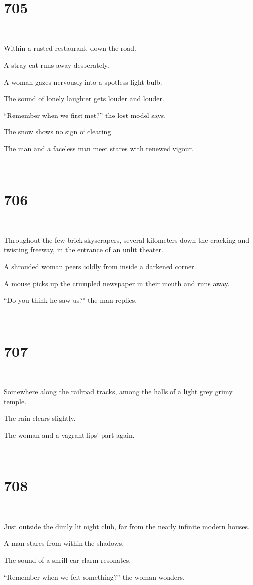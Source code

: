 \documentclass{report}
\begin{document}
~
\chapter*{705}
~

Within a rusted restaurant, down the road.

A stray cat runs away desperately.

A woman gazes nervously into a spotless light-bulb.

The sound of lonely laughter gets louder and louder.

``Remember when we first met?'' the lost model says.

The snow shows no sign of clearing.

The man and a faceless man meet stares with renewed vigour.

~
\chapter*{706}
~

Throughout the few brick skyscrapers, several kilometers down the cracking and twisting freeway, in the entrance of an unlit theater.

A shrouded woman peers coldly from inside a darkened corner.

A mouse picks up the crumpled newspaper in their mouth and runs away.

``Do you think he saw us?'' the man replies.

~
\chapter*{707}
~

Somewhere along the railroad tracks, among the halls of a light grey grimy temple.

The rain clears slightly.

The woman and a vagrant lips' part again.

~
\chapter*{708}
~

Just outside the dimly lit night club, far from the nearly infinite modern houses.

A man stares from within the shadows.

The sound of a shrill car alarm resonates.

``Remember when we felt something?'' the woman wonders.
\end{document}

